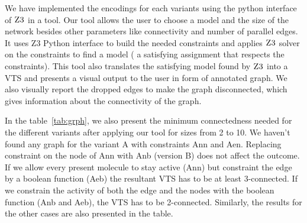 %

We have implemented the encodings for each variants
using the python interface of $\textsc{Z3}$ in a tool.
%
Our tool allows the user to choose a model and the size of the network
besides other parameters like connectivity and number of parallel
edges.
%
It uses Z3 Python interface to build the needed constraints and
applies $\textsc{Z3}$ solver on the constraints to find a model (
a satisfying assignment that respects the constraints).
%
This tool also translates the satisfying model found by $\textsc{Z3}$ into
a VTS and presents a visual output to the user in form of annotated graph.
%
%
%
We also visually report the dropped edges to make the graph
disconnected, which gives information about the connectivity of the
graph.


In the table~\ref{tab:grph}, we also present the minimum connectedness needed for
the different variants after applying our tool for sizes from 2 to 10.
%
We haven't found any graph for the variant A with constraints Ann and Aen.
%
Replacing constraint on the node of Ann with Anb (version B) does not affect the outcome.
%
If we allow every present molecule to stay active (Ann) but constraint the edge
by a boolean function (Aeb) the resultant VTS has to be at least 3-connected.
%
If we constrain the activity of both the edge and the nodes with the boolean function (Anb and Aeb), 
the VTS has to be 2-connected.
%
Similarly, the results for the other cases are also presented in the table.


